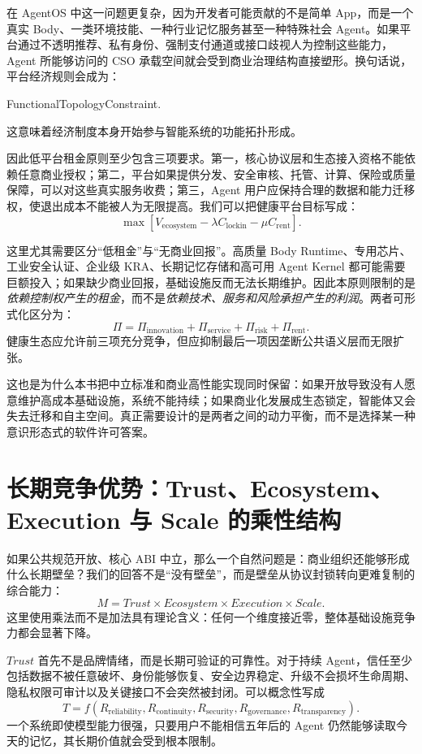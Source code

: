 在 AgentOS 中这一问题更复杂，因为开发者可能贡献的不是简单 App，而是一个真实 Body、一类环境技能、一种行业记忆服务甚至一种特殊社会 Agent。如果平台通过不透明推荐、私有身份、强制支付通道或接口歧视人为控制这些能力，Agent 所能够访问的 CSO 承载空间就会受到商业治理结构直接塑形。换句话说，平台经济规则会成为：
\begin{statementbox}
FunctionalTopologyConstraint.
\end{statementbox}
这意味着经济制度本身开始参与智能系统的功能拓扑形成。

因此低平台租金原则至少包含三项要求。第一，核心协议层和生态接入资格不能依赖任意商业授权；第二，平台如果提供分发、安全审核、托管、计算、保险或质量保障，可以对这些真实服务收费；第三，Agent 用户应保持合理的数据和能力迁移权，使退出成本不能被人为无限提高。我们可以把健康平台目标写成：
\[
\max
\left[
V_{\mathrm{ecosystem}}
-
\lambda C_{\mathrm{lockin}}
-
\mu C_{\mathrm{rent}}
\right].
\]

这里尤其需要区分``低租金''与``无商业回报''。高质量 Body Runtime、专用芯片、工业安全认证、企业级 KRA、长期记忆存储和高可用 Agent Kernel 都可能需要巨额投入；如果缺少商业回报，基础设施反而无法长期维护。因此本原则限制的是\emph{依赖控制权产生的租金}，而不是\emph{依赖技术、服务和风险承担产生的利润}。两者可形式化区分为：
\[
\Pi
=
\Pi_{\mathrm{innovation}}
+
\Pi_{\mathrm{service}}
+
\Pi_{\mathrm{risk}}
+
\Pi_{\mathrm{rent}}.
\]
健康生态应允许前三项充分竞争，但应抑制最后一项因垄断公共语义层而无限扩张。

这也是为什么本书把中立标准和商业高性能实现同时保留：如果开放导致没有人愿意维护高成本基础设施，系统不能持续；如果商业化发展成生态锁定，智能体又会失去迁移和自主空间。真正需要设计的是两者之间的动力平衡，而不是选择某一种意识形态式的软件许可答案。

\section{长期竞争优势：Trust、Ecosystem、Execution 与 Scale 的乘性结构}

如果公共规范开放、核心 ABI 中立，那么一个自然问题是：商业组织还能够形成什么长期壁垒？我们的回答不是``没有壁垒''，而是壁垒从协议封锁转向更难复制的综合能力：
\[
\boxed{
M
=
Trust
\times
Ecosystem
\times
Execution
\times
Scale.
}
\]
这里使用乘法而不是加法具有理论含义：任何一个维度接近零，整体基础设施竞争力都会显著下降。

$Trust$ 首先不是品牌情绪，而是长期可验证的可靠性。对于持续 Agent，信任至少包括数据不被任意破坏、身份能够恢复、安全边界稳定、升级不会损坏生命周期、隐私权限可审计以及关键接口不会突然被封闭。可以概念性写成
\[
T
=
f(
R_{\mathrm{reliability}},
R_{\mathrm{continuity}},
R_{\mathrm{security}},
R_{\mathrm{governance}},
R_{\mathrm{transparency}}
).
\]
一个系统即使模型能力很强，只要用户不能相信五年后的 Agent 仍然能够读取今天的记忆，其长期价值就会受到根本限制。


